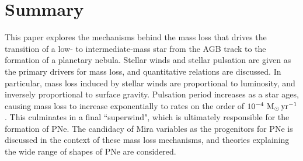 \documentclass[twocolumn]{aastex63}
\begin{document}
\section{Summary}\label{sec:summary}

This paper explores the mechanisms behind the mass loss that drives the transition of a low- to intermediate-mass star from the AGB track to the formation of a planetary nebula. Stellar winds and stellar pulsation are given as the primary drivers for mass loss, and quantitative relations are discussed. In particular, mass loss induced by stellar winds are proportional to luminosity, and inversely proportional to surface gravity. Pulsation period increases as a star ages, causing mass loss to increase exponentially to rates on the order of $10^{-4}~{\rm M_\odot\,yr^{-1}}$. This culminates in a final ``superwind", which is ultimately responsible for the formation of PNe. The candidacy of Mira variables as the progenitors for PNe is discussed in the context of these mass loss mechanisms, and theories explaining the wide range of shapes of PNe are considered. 



\nocite{*}

\end{document}
